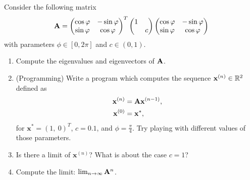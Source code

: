 \begin{Sheet}
  \begin{Problem}
    Consider the following matrix
    \begin{gather*}
      \mathbf A =
      \begin{pmatrix}
        \cos\varphi & -\sin\varphi\\
        \sin\varphi &  \cos\varphi
      \end{pmatrix}^T
      \begin{pmatrix}
        1 & \\
          & c
      \end{pmatrix}
      \begin{pmatrix}
        \cos\varphi & -\sin\varphi\\
        \sin\varphi &  \cos\varphi
      \end{pmatrix}
    \end{gather*}
    with parameters $\phi\in[0,2\pi]$ and $c\in(0,1)$.
    \begin{enumerate}
    \item Compute the eigenvalues and eigenvectors of $\mathbf A$.
    \item (Programming) Write a program which computes the sequence
      $\mathbf x^{(n)}\in\mathbb R^2$ defined as
      \begin{align*}
        \mathbf x^{(n)} &= \mathbf A \mathbf x^{(n-1)}, \\
        \mathbf x^{(0)} &= \mathbf x^{*},
      \end{align*}
      for $\bm x^{*} = (1,\ 0)^T$, $c = 0.1$, and
      $\phi=\frac\pi4$. Try playing with different values of those
      parameters.
    \item Is there a limit of $\bm x^{(n)}$? What is about the case
      $c=1$?
    \item Compute the limit: $\lim_{n\to\infty}\mathbf A^n$.
    \end{enumerate}
  \end{Problem}
\end{Sheet}

